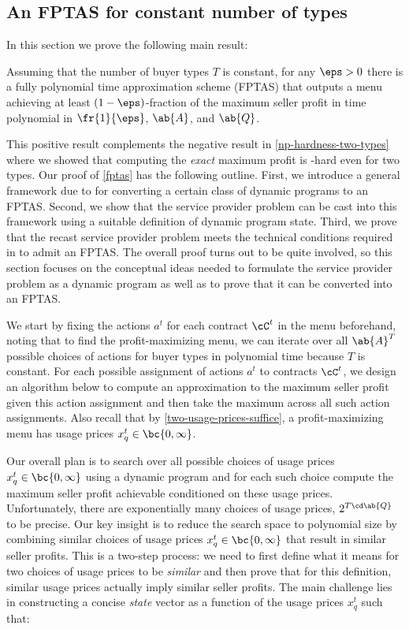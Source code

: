 \subsection{An FPTAS for constant number of types} \label{fptas-section}

In this section we prove the following main result:

\begin{theorem} \label{fptas}
    Assuming that the number of buyer types $T$ is constant, for any $\eps > 0$ there is a fully polynomial time approximation scheme (FPTAS) that outputs a menu achieving at least $(1-\eps)$-fraction of the maximum seller profit in time polynomial in $\fr{1}{\eps}$, $\ab{A}$, and $\ab{Q}$.
\end{theorem}

This positive result complements the negative result in \cref{np-hardness-two-types} where we showed that computing the \emph{exact} maximum profit is -hard even for two types. Our proof of \cref{fptas} has the following outline. First, we introduce a general framework due to \citet{woeginger2000} for converting a certain class of dynamic programs to an FPTAS. Second, we show that the service provider problem can be cast into this framework using a suitable definition of dynamic program state. Third, we prove that the recast service provider problem meets the technical conditions required in \citet{woeginger2000} to admit an FPTAS. The overall proof turns out to be quite involved, so this section focuses on the conceptual ideas needed to formulate the service provider problem as a dynamic program as well as to prove that it can be converted into an FPTAS.

 We start by fixing the actions $a^t$ for each contract $\cC^t$ in the menu beforehand, noting that to find the profit-maximizing menu, we can iterate over all $\ab{A}^T$ possible choices of actions for buyer types in polynomial time because $T$ is constant. For each possible assignment of actions $a^{t}$ to contracts $\cC^{t}$, we design an algorithm below to compute an approximation to the maximum seller profit given this action assignment and then take the maximum across all such action assignments. Also recall that by \cref{two-usage-prices-suffice}, a profit-maximizing menu has usage prices $x^t_q\in \bc{0,\infty}$. 

Our overall plan is to search over all possible choices of usage prices $x^t_q\in \bc{0,\infty}$ using a dynamic program and for each such choice compute the maximum seller profit achievable conditioned on these usage prices. Unfortunately, there are exponentially many choices of usage prices, $2^{T\cd \ab{Q}}$ to be precise. Our key insight is to reduce the search space to polynomial size by combining similar choices of usage prices $x^t_q\in \bc{0,\infty}$ that result in similar seller profits. This is a two-step process: we need to first define what it means for two choices of usage prices to be \emph{similar} and then prove that for this definition, similar usage prices actually imply similar seller profits. The main challenge lies in constructing a concise \emph{state} vector as a function of the usage prices $x^t_q$ such that:

